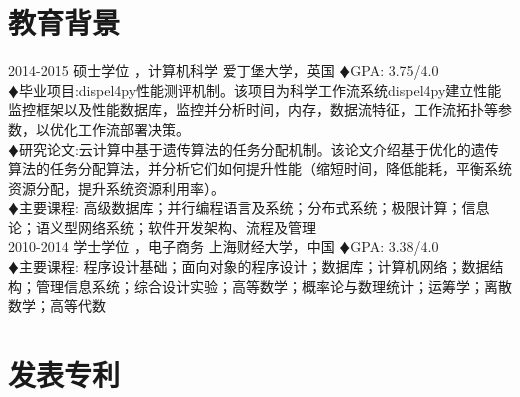 \documentclass[]{friggeri-cv-cn} %
\begin{document}

\section{教育背景}

\begin{entrylist}
	\entry
	{2014-2015}
	{硕士学位 {\normalfont ，计算机科学}}
	{爱丁堡大学，英国}
	{
		{\color{red} $\vardiamondsuit $}GPA: 3.75/4.0\\
		{\color{red} $\vardiamondsuit $}毕业项目:dispel4py性能测评机制。该项目为科学工作流系统dispel4py建立性能监控框架以及性能数据库，监控并分析时间，内存，数据流特征，工作流拓扑等参数，以优化工作流部署决策。\\
		{\color{red} $\vardiamondsuit $}研究论文:云计算中基于遗传算法的任务分配机制。该论文介绍基于优化的遗传算法的任务分配算法，并分析它们如何提升性能（缩短时间，降低能耗，平衡系统资源分配，提升系统资源利用率）。\\
		{\color{red} $\vardiamondsuit $}主要课程:
		高级数据库；并行编程语言及系统；分布式系统；极限计算；信息论；语义型网络系统；软件开发架构、流程及管理
	}
\\
	\entry
	{2010-2014}
	{学士学位 {\normalfont ，电子商务}}
	{上海财经大学，中国}
	{
		{\color{red} $\vardiamondsuit $}GPA: 3.38/4.0\\
		{\color{red} $\vardiamondsuit $}主要课程:
		程序设计基础；面向对象的程序设计；数据库；计算机网络；数据结构；管理信息系统；综合设计实验；高等数学；概率论与数理统计；运筹学；离散数学；高等代数
	}
\end{entrylist}

%
\section{发表专利}


\end{document}
